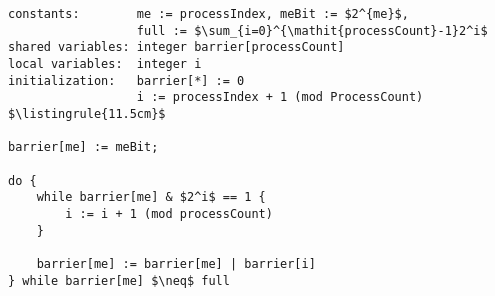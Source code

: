 \begin{minipage}
\centering
\begin{lstlisting}[mathescape, linewidth=11.5cm]
constants:        me := processIndex, meBit := $2^{me}$,
                  full := $\sum_{i=0}^{\mathit{processCount}-1}2^i$
shared variables: integer barrier[processCount]
local variables:  integer i
initialization:   barrier[*] := 0
                  i := processIndex + 1 (mod ProcessCount)
$\listingrule{11.5cm}$

barrier[me] := meBit;

do {
	while barrier[me] & $2^i$ == 1 {
		i := i + 1 (mod processCount)
	}

	barrier[me] := barrier[me] | barrier[i]
} while barrier[me] $\neq$ full
\end{lstlisting}
\end{minipage}
